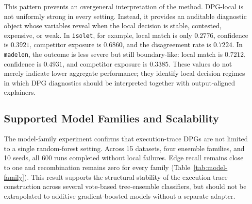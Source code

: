 \documentclass[runningheads]{llncs}
\begin{document}
\begin{table}[ht!]
\centering
\scriptsize
\setlength{\tabcolsep}{3pt}
\caption{Dataset/model regimes for execution-trace DPG diagnostics. Local match is the rate at which the DPG explanation class matches the model prediction. Vote agr.\ is mean model-vote agreement and Comp.\ exposure is mean competitor exposure.}
\label{tab:regime-summary}
\end{table}

This pattern prevents an overgeneral interpretation of the method. DPG-local is not uniformly strong in every setting. Instead, it provides an auditable diagnostic object whose variables reveal when the local decision is stable, contested, expensive, or weak. In \texttt{isolet}, for example, local match is only $0.2776$, confidence is $0.3921$, competitor exposure is $0.6860$, and the disagreement rate is $0.7224$. In \texttt{madelon}, the outcome is less severe but still boundary-like: local match is $0.7212$, confidence is $0.4931$, and competitor exposure is $0.3385$. These values do not merely indicate lower aggregate performance; they identify local decision regimes in which DPG diagnostics should be interpreted together with output-aligned explainers.

\subsection{Supported Model Families and Scalability}

The model-family experiment confirms that execution-trace DPGs are not limited to a single random-forest setting. Across 15 datasets, four ensemble families, and 10 seeds, all 600 runs completed without local failures. Edge recall remains close to one and recombination remains zero for every family (Table~\ref{tab:model-family}). This result supports the structural stability of the execution-trace construction across several vote-based tree-ensemble classifiers, but should not be extrapolated to additive gradient-boosted models without a separate adapter.
\end{document}
